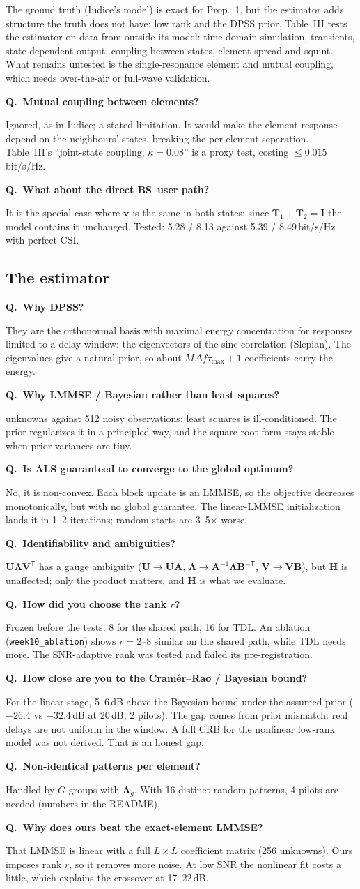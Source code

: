 \documentclass[11pt,a4paper]{article}
\newcounter{qn}
\newcommand{\Q}[1]{\stepcounter{qn}\par\medskip\noindent\textbf{Q\theqn.\ #1}\par\nopagebreak\noindent}
\newcommand{\T}{\mathsf T}
\begin{document}
The ground truth (Iudice's model) is exact for Prop.~1, but the estimator adds structure the truth does not have: low rank
and the DPSS prior. Table~III tests the estimator on data from outside its model: time-domain simulation, transients,
state-dependent output, coupling between states, element spread and squint. What remains untested is the single-resonance
element and mutual coupling, which needs over-the-air or full-wave validation.
\Q{Mutual coupling between elements?}
Ignored, as in Iudice; a stated limitation. It would make the element response depend on the neighbours' states, breaking
the per-element separation. Table~III's ``joint-state coupling, $\kappa=0.08$'' is a proxy test, costing $\le0.015$\,bit/s/Hz.
\Q{What about the direct BS--user path?}
It is the special case where $\bm v$ is the same in both states; since $\bm T_1+\bm T_2=\bm I$ the model contains it
unchanged. Tested: 5.28 / 8.13 against 5.39 / 8.49\,bit/s/Hz with perfect CSI.

\subsection{The estimator}
\Q{Why DPSS?}
They are the orthonormal basis with maximal energy concentration for responses limited to a delay window: the eigenvectors
of the sinc correlation (Slepian). The eigenvalues give a natural prior, so about $M\Delta f\tau_{\max}+1$ coefficients carry
the energy.
\Q{Why LMMSE / Bayesian rather than least squares?}
448 unknowns against 512 noisy observations: least squares is ill-conditioned. The prior regularizes it in a principled
way, and the square-root form stays stable when prior variances are tiny.
\Q{Is ALS guaranteed to converge to the global optimum?}
No, it is non-convex. Each block update is an LMMSE, so the objective decreases monotonically, but with no global
guarantee. The linear-LMMSE initialization lands it in 1--2 iterations; random starts are 3--5$\times$ worse.
\Q{Identifiability and ambiguities?}
$\bm U\bm\Lambda\bm V^{\T}$ has a gauge ambiguity ($\bm U\to\bm U\bm A$, $\bm\Lambda\to\bm A^{-1}\bm\Lambda\bm B^{-\T}$,
$\bm V\to\bm V\bm B$), but $\bm H$ is unaffected; only the product matters, and $\bm H$ is what we evaluate.
\Q{How did you choose the rank $r$?}
Frozen before the tests: 8 for the shared path, 16 for TDL. An ablation (\texttt{week10\_ablation}) shows $r=2$--8 similar
on the shared path, while TDL needs more. The SNR-adaptive rank was tested and failed its pre-registration.
\Q{How close are you to the Cram\'er--Rao / Bayesian bound?}
For the linear stage, 5--6\,dB above the Bayesian bound under the assumed prior ($-26.4$ vs $-32.4$\,dB at 20\,dB, 2 pilots).
The gap comes from prior mismatch: real delays are not uniform in the window. A full CRB for the nonlinear low-rank model
was not derived. That is an honest gap.
\Q{Non-identical patterns per element?}
Handled by $G$ groups with $\bm\Lambda_g$. With 16 distinct random patterns, 4 pilots are needed (numbers in the README).
\Q{Why does ours beat the exact-element LMMSE?}
That LMMSE is linear with a full $L\times L$ coefficient matrix (256 unknowns). Ours imposes rank $r$, so it removes more
noise. At low SNR the nonlinear fit costs a little, which explains the crossover at 17--22\,dB.
\end{document}
